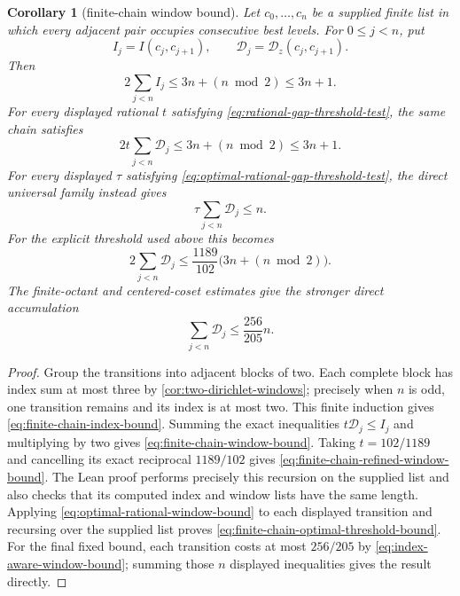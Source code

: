 \documentclass[11pt]{article}
\newtheorem{corollary}[corollary]{Corollary}
\begin{document}
\begin{corollary}[finite-chain window bound]
\label{cor:finite-dirichlet-chain}
Let $c_0,\ldots,c_n$ be a supplied finite list in which every adjacent pair
occupies consecutive best levels.  For $0\le j<n$, put
\[
 I_j=I(c_j,c_{j+1}),\qquad
 \mathcal D_j=\mathcal D_z(c_j,c_{j+1}).
\]
Then
\begin{equation}
\label{eq:finite-chain-index-bound}
 2\sum_{j<n} I_j\le3n+(n\bmod2)\le3n+1.
\end{equation}
For every displayed rational $t$ satisfying
\eqref{eq:rational-gap-threshold-test}, the same chain satisfies
\begin{equation}
\label{eq:finite-chain-window-bound}
 2t\sum_{j<n}\mathcal D_j\le3n+(n\bmod2)\le3n+1.
\end{equation}
For every displayed $\tau$ satisfying
\eqref{eq:optimal-rational-gap-threshold-test}, the direct universal family
instead gives
\begin{equation}
\label{eq:finite-chain-optimal-threshold-bound}
       \tau\sum_{j<n}\mathcal D_j\le n.
\end{equation}
For the explicit threshold used above this becomes
\begin{equation}
\label{eq:finite-chain-refined-window-bound}
 2\sum_{j<n}\mathcal D_j
 \le\frac{1189}{102}\bigl(3n+(n\bmod2)\bigr).
\end{equation}
The finite-octant and centered-coset estimates give the stronger direct
accumulation
\begin{equation}
\label{eq:finite-chain-index-aware-window-bound}
 \sum_{j<n}\mathcal D_j
 \le\frac{256}{205}n.
\end{equation}
\end{corollary}

\begin{proof}
Group the transitions into adjacent blocks of two.  Each complete block has
index sum at most three by \cref{cor:two-dirichlet-windows}; precisely when
$n$ is odd, one transition remains and its index is at most two.  This finite
induction gives
\eqref{eq:finite-chain-index-bound}.  Summing the exact inequalities
$t\mathcal D_j\le I_j$ and multiplying by two gives
\eqref{eq:finite-chain-window-bound}.  Taking $t=102/1189$ and cancelling its
exact reciprocal $1189/102$ gives
\eqref{eq:finite-chain-refined-window-bound}.  The Lean proof performs
precisely this recursion on the supplied list and also checks that its
computed index and window lists have the same length.  Applying
\eqref{eq:optimal-rational-window-bound} to each displayed transition and
recursing over the supplied list proves
\eqref{eq:finite-chain-optimal-threshold-bound}.  For the final fixed bound,
each transition costs at most $256/205$ by
\eqref{eq:index-aware-window-bound}; summing those $n$ displayed inequalities
gives the result directly.
\end{proof}
\end{document}

